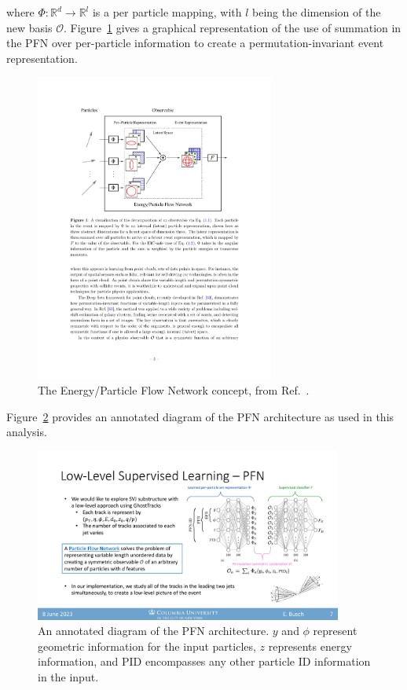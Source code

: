 where $\Phi : \mathbb{R}^d \rightarrow \mathbb{R}^l$ is a per particle mapping, with $l$ being the dimension of the new basis $\mathcal{O}$. Figure~\ref{fig:pfn_paper} gives a graphical representation of the use of summation in the PFN over per-particle information to create a permutation-invariant event representation. \par
\begin{figure}[!htbp]
\centering
   \includegraphics[width=0.7\textwidth]{figures/ml/pfn_paper}
    \caption{The Energy/Particle Flow Network concept, from Ref.~\cite{pfn}.
    \label{fig:pfn_paper}}
\end{figure}

Figure~\ref{fig:pfn_arch} provides an annotated diagram of the PFN architecture as used in this analysis. 
\begin{figure}[!htbp]
\centering
   \includegraphics[width=0.9\textwidth]{figures/ml/pfn_arch}
    \caption{An annotated diagram of the PFN architecture. $y$ and $\phi$ represent geometric information for the input particles, $z$ represents energy information, and PID encompasses any other particle ID information in the input.
        \label{fig:pfn_arch}}
\end{figure}

